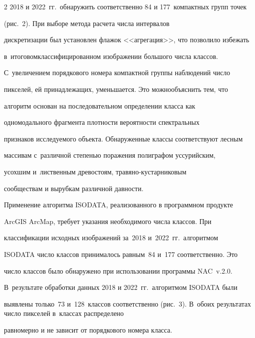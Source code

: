 \begin{multicols}{2}
2018 и 2022~гг.\ обнаружить соответственно 84 и 177~компактных групп точек 


(рис.~2). При выборе метода расчета чис\-ла интервалов 


дискретизации был установлен флажок <<агрегация>>, что позволило избежать 


в~итоговом\linebreak классифицированном изображении большого чис\-ла классов. 


С~увеличением порядкового номера компактной группы наблюдений чис\-ло 


пикселей, ей при\-над\-ле\-жа\-щих, уменьшается. Это можно\linebreak объяснить тем, что 


алгоритм основан на по\-сле\-до\-ва\-тель\-ном опре\-де\-ле\-нии класса как 


одномодального фрагмента плот\-ности ве\-ро\-ятн\-ости спект\-раль\-ных 


признаков исследуемого объекта. \mbox{Обнаруженные} классы соответствуют лес\-ным 


массивам с~различной сте\-пенью поражения полиграфом уссурийским, 


усохшим и~лиственным древостоям, тра\-вя\-но-кус\-тар\-ни\-ко\-вым 


сообществам и вырубкам различной дав\-ности.











  Применение алгоритма ISODATA, реализованного в программном продукте 


ArcGIS ArcMap, требует указания необходимого числа классов. При 


классификации исходных изображений за~2018 и~2022~гг.\ алгоритмом 


ISODATA число классов принималось равным~84 и~177 соответственно. Это 


число классов было обнаружено при использовании программы NAC~v.2.0. 


В~результате обработки данных 2018 и 2022~гг.\ алгоритмом ISODATA были


выявлены только~73 и~128~классов соответственно (рис.~3). В~обоих результатах число пикселей в~классах распределено 


равномерно и не зависит от порядкового номера класса.



\end{multicols}
